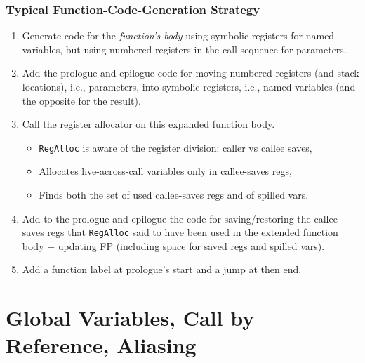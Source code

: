 \documentclass{beamer}
\renewcommand{\emph}[1]{\textcolor{structure}{#1}}
\newcommand{\emp}[1]{\textcolor{DikuRed}{ #1}}
\begin{document}
\begin{frame}
\frametitle{Typical Function-Code-Generation Strategy}

\begin{enumerate}

\item Generate code for the {\em function's body} using \emph{symbolic registers}
        for \emph{named variables}, but using \emp{numbered registers} in the call
        sequence for \emp{parameters}.\smallskip

\item  Add the prologue and epilogue code for moving \emp{numbered registers} 
            (and stack locations), i.e., \emp{parameters}, into 
            \emph{symbolic registers}, i.e., \emph{named variables} 
            (and the opposite for the result).\smallskip


\item Call the register allocator on this expanded function body.
        \begin{itemize}
            \item {\tt RegAlloc} is aware of the register division: caller vs callee saves,
            \item Allocates live-across-call variables only in callee-saves regs,
            \item Finds both the set of used callee-saves regs and of spilled vars.\smallskip
        \end{itemize}

\item Add to the prologue and epilogue the code for saving/restoring
        the callee-saves regs that {\tt RegAlloc} said to have been used 
        in the extended function body $+$ updating \textsc{FP} 
        (including space for saved regs and spilled vars).\smallskip


\item Add a function label at prologue's start and a jump at then end.

\end{enumerate}
\end{frame}

\section{Global Variables, Call by Reference, Aliasing}
\end{document}
